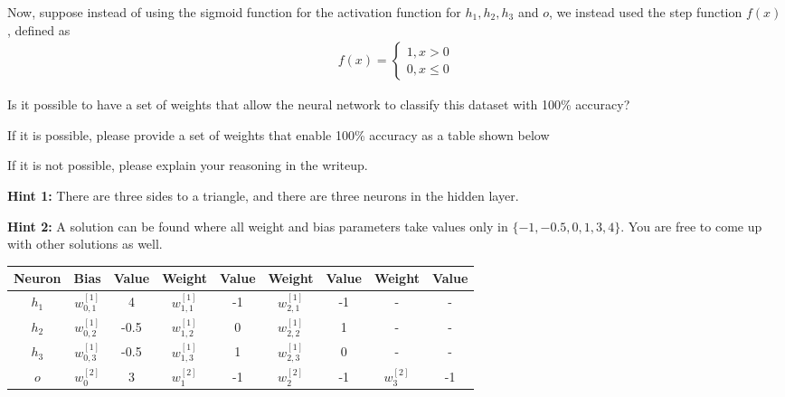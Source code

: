 \item {} Now, suppose instead of using the sigmoid function for the activation function for $h_1, h_2, h_3$ and $o$, we instead used the step function $f(x)$, defined as
\begin{align*}
f(x) = \begin{cases}
    1, x > 0 \\
    0, x \le 0
    \end{cases}
\end{align*}

Is it possible to have a set of weights that allow the neural network to classify this dataset with 100\% accuracy?

If it is possible, please provide a set of weights that enable 100\% accuracy as a table shown below

If it is not possible, please explain your reasoning in the writeup.

\textbf{Hint 1:} There are three sides to a triangle, and there are three neurons in the hidden layer.

\textbf{Hint 2:} A solution can be found where all weight and bias parameters take values only in $\{-1, -0.5, 0, 1, 3, 4 \}$. You are free to come up with other solutions as well.

\begin{table}[h]
\centering
\begin{tabular}{ |c||c|c||c|c||c|c||c|c|}
\hline
Neuron & Bias & Value &  Weight & Value & Weight & Value & Weight & Value\\
\hline
$h_1$ & $w_{0,1}^{[1]}$ & 4 & $w_{1,1}^{[1]}$ & -1 & $w_{2,1}^{[1]}$ & -1  & - & -\\
\hline
$h_2$ & $w_{0,2}^{[1]}$ & -0.5 & $w_{1,2}^{[1]}$ & 0 & $w_{2,2}^{[1]}$ & 1  & - & -\\
\hline
$h_3$ & $w_{0,3}^{[1]}$ & -0.5 & $w_{1,3}^{[1]}$ & 1 & $w_{2,3}^{[1]}$ & 0  & - & - \\
\hline
$o$ & $w_{0}^{[2]}$ & 3 & $w_{1}^{[2]}$ & -1 & $w_{2}^{[2]}$ & -1 & $w_{3}^{[2]}$ & -1 \\
\hline
\end{tabular}
\end{table}